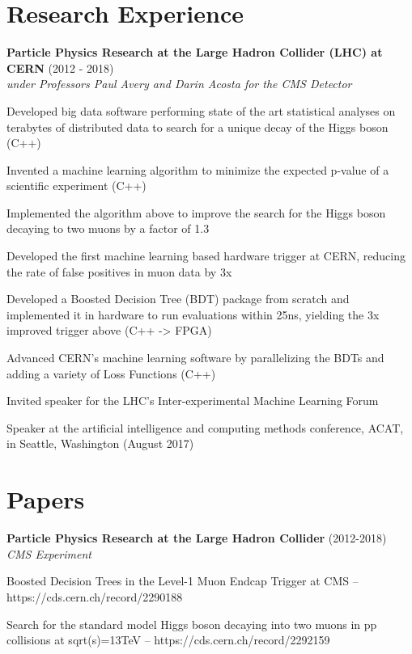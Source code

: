 \begin{resume}
    \section{\mysidestyle Research Experience}
    {\bf Particle Physics Research at the Large Hadron Collider (LHC) at CERN} (2012 - 2018)\\\vspace{2mm}%
    \textit{under Professors Paul Avery and Darin Acosta for the CMS Detector}
    \begin{stuff}
        \vspace*{1mm}
                \item Developed big data software performing state of the art statistical analyses on terabytes of distributed data to search for a unique decay of the Higgs boson (C++)
                \item Invented a machine learning algorithm to minimize the expected p-value of a scientific experiment (C++)
                \vspace*{12mm} 
                \item Implemented the algorithm above to improve the search for the Higgs boson decaying to two muons by a factor of 1.3 
                \item Developed the first machine learning based hardware trigger at CERN, reducing the rate of false positives in muon data by 3x
                \item Developed a Boosted Decision Tree (BDT) package from scratch and implemented it in hardware to run evaluations within 25ns, yielding the 3x improved trigger above (C++ -> FPGA)
                \item Advanced CERN's machine learning software by parallelizing the BDTs and adding a variety of Loss Functions (C++)
                \item Invited speaker for the LHC's Inter-experimental Machine Learning Forum
                \item Speaker at the artificial intelligence and computing methods conference, ACAT, in Seattle, Washington (August 2017)
                                           
    \end{stuff}
    \section{\mysidestyle Papers}
    {\bf Particle Physics Research at the Large Hadron Collider} (2012-2018)\\\vspace{2mm}%
    \textit{CMS Experiment}
    \begin{stuff}
        \vspace*{1mm}
                \item Boosted Decision Trees in the Level-1 Muon Endcap Trigger at CMS -- \\\relax https://cds.cern.ch/record/2290188
                \item Search for the standard model Higgs boson decaying into two muons in pp collisions at sqrt(s)=13TeV -- https://cds.cern.ch/record/2292159
    \end{stuff}


\end{resume}
